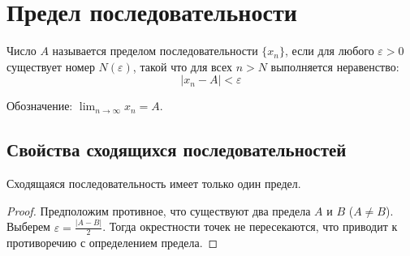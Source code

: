 



\section{Предел последовательности}

\begin{definition}
Число $A$ называется пределом последовательности $\{x_n\}$, если для любого $\varepsilon > 0$ существует номер $N(\varepsilon)$, такой что для всех $n > N$ выполняется неравенство:
\[
|x_n - A| < \varepsilon
\]
\end{definition}

Обозначение: $\lim_{n \to \infty} x_n = A$.

\subsection{Свойства сходящихся последовательностей}
\begin{theorem}
Сходящаяся последовательность имеет только один предел.
\end{theorem}

\begin{proof}
Предположим противное, что существуют два предела $A$ и $B$ ($A \neq B$). Выберем $\varepsilon = \frac{|A-B|}{2}$. Тогда окрестности точек не пересекаются, что приводит к противоречию с определением предела.
\end{proof}


